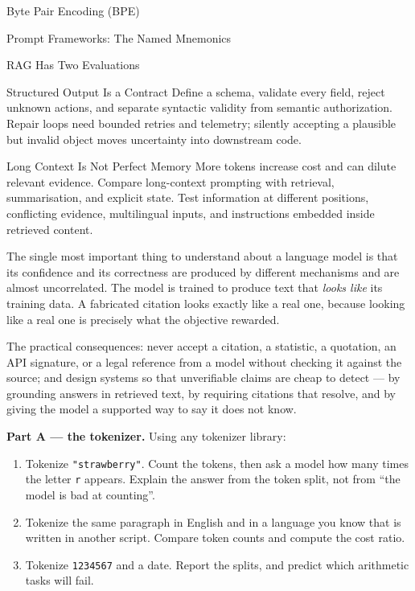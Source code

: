 \begin{v3topic}{Byte Pair Encoding (BPE)}
\begin{v3topic}{Prompt Frameworks: The Named Mnemonics}
\begin{v3topic}{RAG Has Two Evaluations}
\end{v3topic}
\begin{v3topic}{Structured Output Is a Contract}
Define a schema, validate every field, reject unknown actions, and separate
syntactic validity from semantic authorization.
Repair loops need bounded retries and telemetry; silently accepting a plausible
but invalid object moves uncertainty into downstream code.

\end{v3topic}
\begin{v3topic}{Long Context Is Not Perfect Memory}
More tokens increase cost and can dilute relevant evidence.
Compare long-context prompting with retrieval, summarisation, and explicit
state.
Test information at different positions, conflicting evidence, multilingual
inputs, and instructions embedded inside retrieved content.
\end{v3topic}



\begin{cautionbox}
The single most important thing to understand about a language model is that
its confidence and its correctness are produced by different mechanisms and are
almost uncorrelated. The model is trained to produce text that \emph{looks
like} its training data. A fabricated citation looks exactly like a real one,
because looking like a real one is precisely what the objective rewarded.

The practical consequences: never accept a citation, a statistic, a quotation,
an API signature, or a legal reference from a model without checking it against
the source; and design systems so that unverifiable claims are cheap to detect
--- by grounding answers in retrieved text, by requiring citations that resolve,
and by giving the model a supported way to say it does not know.
\end{cautionbox}

\begin{practicallab}
\textbf{Part A --- the tokenizer.} Using any tokenizer library:
\begin{enumerate}
  \item Tokenize \texttt{"strawberry"}. Count the tokens, then ask a model how
        many times the letter \texttt{r} appears. Explain the answer from the
        token split, not from ``the model is bad at counting''.
  \item Tokenize the same paragraph in English and in a language you know that
        is written in another script. Compare token counts and compute the cost
        ratio.
  \item Tokenize \texttt{1234567} and a date. Report the splits, and predict
        which arithmetic tasks will fail.
\end{enumerate}


\end{practicallab}
\end{v3topic}
\end{v3topic}
